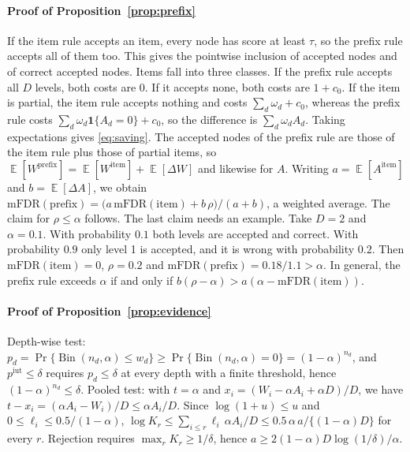 \documentclass[preprint,12pt]{elsarticle}
\theoremstyle{definition}
\newcommand{\fdr}{\mathrm{mFDR}}
\DeclareMathOperator{\E}{\mathbb{E}}
\DeclareMathOperator{\Bin}{Bin}
\begin{document}
\paragraph{Proof of Proposition~\ref{prop:prefix}}
If the item rule accepts an item, every node has score at least $\tau$, so the prefix
rule accepts all of them too. This gives the pointwise inclusion of accepted nodes and
of correct accepted nodes. Items fall into three classes. If the prefix rule accepts
all $D$ levels, both costs are $0$. If it accepts none, both costs are $1+c_0$. If the item is
partial, the item rule accepts nothing and costs $\sum_d\omega_d+c_0$, whereas the prefix rule costs
$\sum_d\omega_d\mathbf{1}\{A_d=0\}+c_0$, so the difference is
$\sum_d\omega_d A_d$. Taking expectations gives \eqref{eq:saving}. The accepted nodes of
the prefix rule are those of the item rule plus those of partial items, so
$\E[W^{\mathrm{prefix}}]=\E[W^{\mathrm{item}}]+\E[\Delta W]$ and likewise for $A$.
Writing $a=\E[A^{\mathrm{item}}]$ and $b=\E[\Delta A]$, we obtain
$\fdr(\mathrm{prefix})=\bigl(a\,\fdr(\mathrm{item})+b\,\rho\bigr)/(a+b)$, a weighted
average. The claim for $\rho\le\alpha$ follows. The last claim needs an example. Take $D=2$ and
$\alpha=0.1$. With probability $0.1$ both levels are accepted and correct. With probability
$0.9$ only level 1 is accepted, and it is wrong with probability $0.2$. Then
$\fdr(\mathrm{item})=0$, $\rho=0.2$ and $\fdr(\mathrm{prefix})=0.18/1.1>\alpha$. In general,
the prefix rule exceeds $\alpha$ if and only if $b(\rho-\alpha)>a(\alpha-\fdr(\mathrm{item}))$.

\paragraph{Proof of Proposition~\ref{prop:evidence}}
Depth-wise test: $p_d=\Pr\{\Bin(n_d,\alpha)\le w_d\}\ge\Pr\{\Bin(n_d,\alpha)=0\}
=(1-\alpha)^{n_d}$, and $p^{\mathrm{iut}}\le\delta$ requires $p_d\le\delta$ at
every depth with a finite threshold, hence $(1-\alpha)^{n_d}\le\delta$. Pooled
test: with $t=\alpha$ and $x_i=(W_i-\alpha A_i+\alpha D)/D$, we have
$t-x_i=(\alpha A_i-W_i)/D\le\alpha A_i/D$. Since $\log(1+u)\le u$ and
$0\le\ell_i\le0.5/(1-\alpha)$,
$\log K_r\le\sum_{i\le r}\ell_i\,\alpha A_i/D\le
0.5\,\alpha\,a/\{(1-\alpha)D\}$ for every $r$. Rejection requires
$\max_r K_r\ge1/\delta$, hence $a\ge2(1-\alpha)D\log(1/\delta)/\alpha$.
\end{document}
